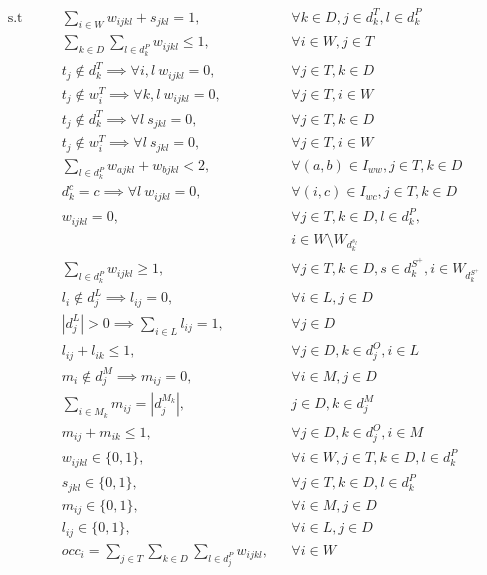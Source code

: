 \documentclass[../../thesis.tex]{subfiles}
\begin{document}
\begin{align*}
    \textrm{s.t} \qquad & \sum_{i \in W} w_{ijkl} + s_{jkl} = 1, && \forall k \in D, j \in d_k^T, l \in d_k^P \\
    & \sum_{k \in D} \sum_{l \in d_k^P} w_{ijkl} \leq 1, && \forall i \in W, j \in T  \\
    & t_j \notin d^T_{k} \implies \forall i, l \ w_{ijkl} = 0,  && \forall j \in T , k \in D \\
    & t_j \notin w^T_{i} \implies \forall k, l \ w_{ijkl} = 0, && \forall j \in T, i \in W  \\ 
    & t_j \notin d^T_{k} \implies \forall l \ s_{jkl} = 0,  && \forall j \in T , k \in D  \\
    & t_j \notin w^T_{i} \implies \forall l \ s_{jkl} = 0, && \forall j \in T, i \in W  \\ 
    & \sum_{l \in d^P_k} w_{ajkl} + w_{bjkl} < 2, &&  \forall {(a, b) \in I_{ww}}, j \in T, k \in D \\
    & d^c_{k} = c \implies \forall l \ w_{ijkl} = 0, && \forall {(i, c) \in I_{wc}}, j \in T, k \in D  \\ 
    & w_{ijkl} = 0, && \forall j \in T, k \in D, l \in d^P_k,  \\
    & && i \in W \setminus W_{d^{s_l}_k} \\
    & \sum_{l \in d_k^P} w_{ijkl} \geq 1, && \forall j \in T, k \in D, s \in d^{S^+}_k, i \in W_{d^{S^+}_k}  \\
    & l_i \notin d^L_j \implies l_{ij} = 0, && \forall i \in L, j \in D   \\
    & |d^L_j| > 0 \implies \sum_{i \in L} l_{ij} = 1, && \forall j \in D \\
    & l_{ij} + l_{ik} \leq 1, && \forall j \in D, k \in d^O_j, i \in L \\
    & m_i \notin d^M_j \implies m_{ij} = 0, && \forall i \in M, j \in D   \\
    & \sum_{i \in M_k} m_{ij} = |d^{M_k}_j|, && j \in D, k \in d^M_j  \\
    & m_{ij} + m_{ik} \leq 1, && \forall j \in D, k \in d^O_j, i \in M  \\
    & w_{ijkl} \in \{0, 1\}, && \forall i \in W, j \in T, k \in D, l \in d^P_k  \\
    & s_{jkl} \in \{0, 1\}, && \forall j \in T, k \in D, l \in d^P_k  \\
    & m_{ij} \in \{0, 1\}, && \forall i \in M, j \in D  \\ 
    & l_{ij} \in \{0, 1\}, && \forall i \in L, j \in D  \\ 
    & occ_i = \sum_{j \in T} \sum_{k \in D} \sum_{l \in d^P_j} w_{ijkl}, && \forall i \in W 
\end{align*}
\endgroup
\end{document}
